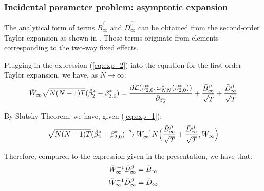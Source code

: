 \begin{frame}
        \frametitle{Incidental parameter problem: asymptotic expansion}
    The analytical form of terms $\bar{B}^\beta_\infty$ and $\bar{D}^\beta_\infty$ can be obtained from the second-order Taylor expansion as shown in \cite{fernandez2016individual}. Those terms originate from elements corresponding to the two-way fixed effects.
    
    Plugging in the expression (\ref{eq:exp_2}) into the equation for the first-order Taylor expansion, we have, as $N \xrightarrow{} \infty$:
    \begin{align}
        \Bar{W}_\infty \sqrt{N(N-1)T} (\hat{\beta}_2^* - \beta_{2,0}^*) = \frac{\partial \mathcal{L} ({\beta}_{2,0}^*, {\omega}_{NN}^*(\beta_{2,0}^*))}{\partial_{\beta_{2}^*} }  + \frac{\bar{B}^\beta_\infty}{\sqrt{T}} + \frac{\bar{D}^\beta_\infty}{\sqrt{T}} 
    \end{align}
    
    By Slutsky Theorem, we have, given (\ref{eq:exp_1}):
    \begin{align}
        \sqrt{N(N-1)T} (\hat{\beta}_2^* - \beta_{2,0}^*) \xrightarrow{d} \Bar{W}_\infty^{-1} N \Big(\frac{\bar{B}^\beta_\infty}{\sqrt{T}} + \frac{\bar{D}^\beta_\infty}{\sqrt{T}} , \Bar{W}_\infty \Big)
    \end{align}
    
    Therefore, compared to the expression given in the presentation, we have that:
    $$ \Bar{W}_\infty^{-1} \bar{B}^\beta_\infty = \bar{B}_\infty  $$
    $$ \Bar{W}_\infty^{-1} \bar{D}^\beta_\infty =  \bar{D}_\infty  $$
    
\end{frame}
